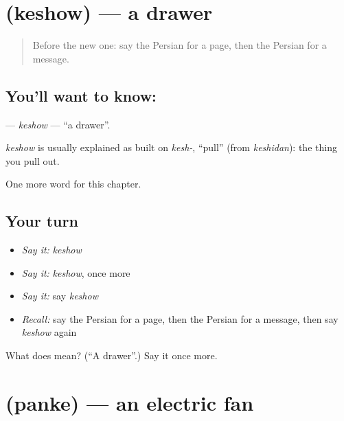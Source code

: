\section[\texorpdfstring{\fa{کشو} (keshow)}{کشو (keshow)}]{ (keshow) — a drawer}

\label{lesson:FA-C246-keshow}



\begin{quote}
Before the new one: say the Persian for a page, then the Persian for a message.
\end{quote}

\subsection*{You'll want to know: }
\textbf{} — \emph{keshow} — \textquotedblleft{}a drawer\textquotedblright{}.

\begin{cousinweb}
\emph{keshow} is usually explained as built on \emph{kesh-}, \textquotedblleft{}pull\textquotedblright{} (from \emph{keshidan}): the thing you pull out.
\end{cousinweb}

\begin{grammarlens}[title={What you've built}]
One more word for this chapter.
\end{grammarlens}

\subsection*{Your turn}
\begin{itemize}
\raggedright
  \item \emph{Say it:} \emph{keshow}
  \item \emph{Say it:} \emph{keshow}, once more
  \item \emph{Say it:} say \emph{keshow}
  \item \emph{Recall:} say the Persian for a page, then the Persian for a message, then say \emph{keshow} again
\end{itemize}

\begin{tcolorbox}[breakable,colback=teal!4,colframe=teal!35!black,title={Before you move on}]
What does  mean? (\textquotedblleft{}A drawer\textquotedblright{}.) Say it once more.
\end{tcolorbox}
\section[\texorpdfstring{\fa{پنکه} (panke)}{پنکه (panke)}]{ (panke) — an electric fan}


